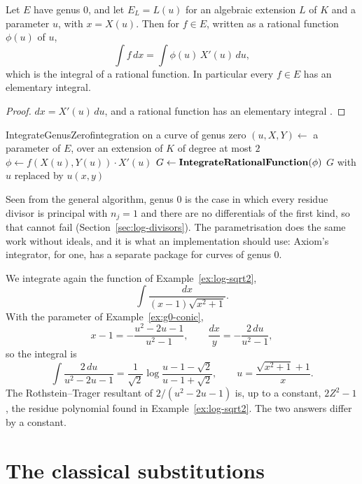 \begin{theorem}\label{thm:g0-integration}
Let $E$ have genus $0$, and let $E_L = L(u)$ for an algebraic extension $L$
of $K$ and a parameter $u$, with $x = X(u)$. Then for $f \in E$, written as a
rational function $\phi(u)$ of $u$,
\[
  \int f\,dx = \int \phi(u)\, X'(u)\, du ,
\]
which is the integral of a rational function. In particular every $f \in E$
has an elementary integral.
\end{theorem}

\begin{proof}
$dx = X'(u)\,du$, and a rational function has an elementary integral
.
\end{proof}

\begin{algo}{IntegrateGenusZero}{f}{integration on a curve of genus zero}
\State $(u, X, Y) \gets$ a parameter of $E$, over an extension of $K$ of degree at most $2$
\State $\phi \gets f(X(u), Y(u)) \cdot X'(u)$
\State $G \gets \textbf{IntegrateRationalFunction}(\phi)$ 
\State \Return $G$ with $u$ replaced by $u(x, y)$
\end{algo}

Seen from the general algorithm, genus $0$ is the case in which every
residue divisor is principal with $n_j = 1$ and there are no differentials of
the first kind, so that  cannot fail
(Section~\ref{sec:log-divisors}). The parametrisation does the same work
without ideals, and it is what an implementation should use: Axiom's
integrator, for one, has a separate package for curves of genus $0$.

\begin{example}\label{ex:g0-sqrt2}
We integrate again the function of Example~\ref{ex:log-sqrt2},
\[
  \int \frac{dx}{(x - 1)\sqrt{x^2 + 1}} .
\]
With the parameter of Example~\ref{ex:g0-conic},
\[
  x - 1 = -\frac{u^2 - 2u - 1}{u^2 - 1}, \qquad
  \frac{dx}{y} = -\frac{2\,du}{u^2 - 1} ,
\]
so the integral is
\[
  \int \frac{2\,du}{u^2 - 2u - 1}
  = \frac{1}{\sqrt2} \log \frac{u - 1 - \sqrt2}{u - 1 + \sqrt2},
  \qquad u = \frac{\sqrt{x^2 + 1} + 1}{x} .
\]
The Rothstein--Trager resultant of $2/(u^2 - 2u - 1)$ is, up to a constant,
$2Z^2 - 1$, the residue polynomial found in Example~\ref{ex:log-sqrt2}. The
two answers differ by a constant.
\end{example}

\section{The classical substitutions}\label{sec:g0-euler}

